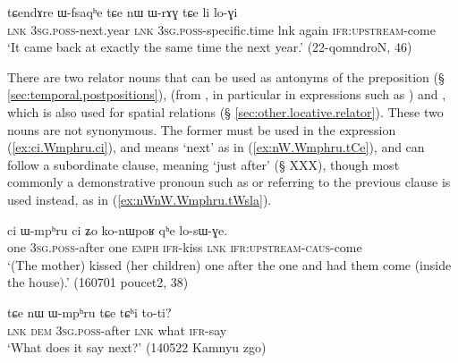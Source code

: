 \begin{exe}
\ex \label{ex:nW.WrAG.tCe.li}
\gll tɕendɤre ɯ-fsaqʰe tɕe nɯ ɯ-rɤɣ tɕe li lo-ɣi \\
\textsc{lnk} \textsc{3sg}.\textsc{poss}-next.year \textsc{lnk} \textsc{3sg}.\textsc{poss}-specific.time lnk again \textsc{ifr}:\textsc{upstream}-come \\
\glt `It came back at exactly the same time the next year.' (22-qomndroN, 46)
\end{exe}


There are two relator nouns that can be used as antonyms of the preposition  (§ \ref{sec:temporal.postpositions}),   (from , in particular in expressions such as ) and , which is also used for spatial relations (§ \ref{sec:other.locative.relator}). These two nouns are not synonymous. The former must be used in the expression  (\ref{ex:ci.Wmphru.ci}), and means `next' as in (\ref{ex:nW.Wmphru.tCe}), and can follow a subordinate clause, meaning `just after' (§ XXX), though most commonly a demonstrative pronoun such as  or  referring to the previous clause is used instead, as in (\ref{ex:nWnW.Wmphru.tWsla}).

\begin{exe}
\ex \label{ex:ci.Wmphru.ci}
 \gll ci ɯ-mpʰru ci ʑo ko-nɯpoʁ qʰe lo-sɯ-ɣe. \\
 one \textsc{3sg}.\textsc{poss}-after one \textsc{emph} \textsc{ifr}-kiss \textsc{lnk} \textsc{ifr}:\textsc{upstream}-\textsc{caus}-come  \\
\glt `(The mother) kissed (her children) one after the one and had them come (inside the house).' (160701 poucet2, 38)
\end{exe}

\begin{exe}
\ex \label{ex:nW.Wmphru.tCe}
 \gll  tɕe nɯ ɯ-mpʰru tɕe tɕʰi to-ti? \\
 \textsc{lnk} \textsc{dem} \textsc{3sg}.\textsc{poss}-after \textsc{lnk} what \textsc{ifr}-say \\
\glt `What does it say next?' (140522 Kamnyu zgo)
\end{exe}

